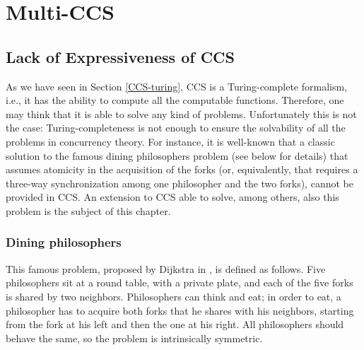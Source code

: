 \chapter{Multi-CCS}\label{multi-ccs}





\section{Lack of Expressiveness of CCS}

  As we have seen in Section \ref{CCS-turing}, CCS is a Turing-complete formalism, i.e., it has the ability to compute all the computable functions. Therefore, one may think that it is able to solve any kind of problems. Unfortunately this is not the case: Turing-completeness is not enough to ensure the solvability of all the problems in concurrency theory. For instance, it is well-known that a classic solution to the famous dining philosophers problem \cite{Dij71} (see below for details)  that assumes atomicity in the acquisition of the forks (or, equivalently, that requires a three-way synchronization among one philosopher and the two forks), cannot be provided  in CCS. An extension to CCS able to solve, among others, also this problem is the subject of this chapter.


\subsection{Dining philosophers}
  This famous problem, proposed by Dijkstra in \cite{Dij71}, is defined as follows. Five philosophers sit at a round table, with a private plate, and each of the five forks is shared by two neighbors. Philosophers can think and eat; in order to eat, a philosopher has to acquire both forks that he shares with his neighbors, starting from the fork at his left and then the one at his right. All philosophers should behave the same, so the problem is intrinsically symmetric.

